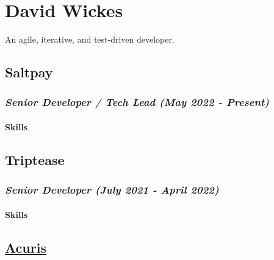\hypertarget{david-wickes}{%
\section{David Wickes}\label{david-wickes}}

An agile, iterative, and test-driven developer.

\hypertarget{saltpay}{%
\subsection{Saltpay}\label{saltpay}}

\hypertarget{senior-developer-tech-lead-may-2022---present}{%
\subsubsection{\texorpdfstring{\emph{Senior Developer / Tech Lead (May
2022 -
Present)}}{Senior Developer / Tech Lead (May 2022 - Present)}}\label{senior-developer-tech-lead-may-2022---present}}

\hypertarget{skills-saltpay}{%
\paragraph{Skills}\label{skills-saltpay}}

\hypertarget{triptease}{%
\subsection{Triptease}\label{triptease}}

\hypertarget{senior-developer-july-2021---april-2022}{%
\subsubsection{\texorpdfstring{\emph{Senior Developer (July 2021 - April
2022)}}{Senior Developer (July 2021 - April 2022)}}\label{senior-developer-july-2021---april-2022}}

\hypertarget{skills-triptease}{%
\paragraph{Skills}\label{skills-triptease}}

\hypertarget{acuris}{%
\subsection{\texorpdfstring{\href{http://www.acuris.com/}{Acuris}}{Acuris}}\label{acuris}}

